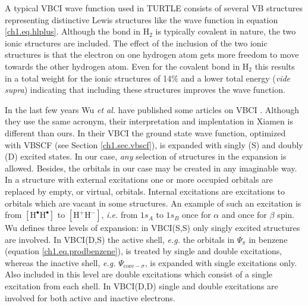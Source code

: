A typical VBCI wave function used in TURTLE consists of several VB structures representing distinctive Lewis structures like the wave function in equation \ref{ch1.eq.hlplus}. Although the bond in H$_2$ is typically covalent in nature, the two ionic structures are included. The effect of the inclusion of the two ionic structures is that the electron on one hydrogen atom gets more freedom to move towards the other hydrogen atom. Even for the covalent bond in H$_2$ this results in a total weight for the ionic structures of 14\% and a lower total energy (\textit{vide supra}) indicating that including these structures improves the wave function.

In the last few years Wu \textit{et al.} have published some articles on VBCI \cite{vbci_wu1,vbci_wu2}. Although they use the same acronym, their interpretation and implentation in Xiamen \cite{xiamen} is different than ours. In their VBCI the ground state wave function, optimized with VBSCF (see Section \ref{ch1.sec.vbscf}), is expanded with singly (S) and doubly (D) excited states. In our case, \textit{any} selection of structures in the expansion is allowed. Besides, the orbitals in our case may be created in any imaginable way. In a structure with external excitations one or more occupied orbitals are replaced by empty, or virtual, orbitals. Internal excitations are excitations to orbitals which are vacant in some structures. An example of such an excitation is from $\mathrm{[H^\bullet H^\bullet]}$ to $\mathrm{[H^{+} H^{-}]}$, \textit{i.e.} from $1s_A$ to $1s_B$ once for $\alpha$ and once for $\beta$ spin. Wu defines three levels of expansion: in VBCI(S,S) only singly excited structures are involved. In VBCI(D,S) the active shell, \textit{e.g.} the orbitals in $\Psi_{\pi}$ in benzene (equation \ref{ch1.eq.prodbenzene}), is treated by single and double excitations, whereas the inactive shell, \textit{e.g.} $\Psi_{\mathrm{core}-\sigma}$, is expanded with single excitations only. Also included in this level are double excitations which consist of a single excitation from each shell. In VBCI(D,D) single and double excitations are involved for both active and inactive electrons.

